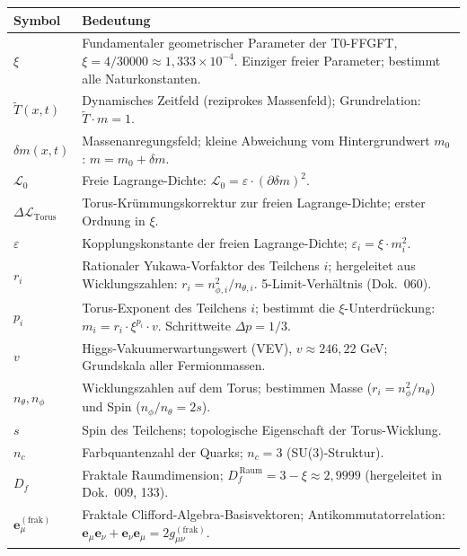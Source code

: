 \begin{longtable}{lp{9.5cm}}
\toprule
\textbf{Symbol} & \textbf{Bedeutung} \\
\midrule
\endhead
$\xi$ & Fundamentaler geometrischer Parameter der T0-FFGFT,
        $\xi = 4/30000 \approx 1{,}333 \times 10^{-4}$.
        Einziger freier Parameter; bestimmt alle Naturkonstanten. \\[4pt]
$\tilde{T}(x,t)$ & Dynamisches Zeitfeld (reziprokes Massenfeld);
        Grundrelation: $\tilde{T} \cdot m = 1$. \\[4pt]
$\delta m(x,t)$ & Massenanregungsfeld; kleine Abweichung vom
        Hintergrundwert $m_0$: $m = m_0 + \delta m$. \\[4pt]
$\mathcal{L}_0$ & Freie Lagrange-Dichte:
        $\mathcal{L}_0 = \varepsilon \cdot (\partial\delta m)^2$. \\[4pt]
$\Delta\mathcal{L}_{\mathrm{Torus}}$ & Torus-Krümmungskorrektur
        zur freien Lagrange-Dichte; erster Ordnung in $\xi$. \\[4pt]
$\varepsilon$ & Kopplungskonstante der freien Lagrange-Dichte;
        $\varepsilon_i = \xi \cdot m_i^2$. \\[4pt]
$r_i$ & Rationaler Yukawa-Vorfaktor des Teilchens $i$;
        hergeleitet aus Wicklungszahlen: $r_i = n_{\phi,i}^2/n_{\theta,i}$.
        5-Limit-Verhältnis (Dok.~060). \\[4pt]
$p_i$ & Torus-Exponent des Teilchens $i$; bestimmt die
        $\xi$-Unterdrückung: $m_i = r_i \cdot \xi^{p_i} \cdot v$.
        Schrittweite $\Delta p = 1/3$. \\[4pt]
$v$ & Higgs-Vakuumerwartungswert (VEV), $v \approx 246{,}22$ GeV;
        Grundskala aller Fermionmassen. \\[4pt]
$n_\theta, n_\phi$ & Wicklungszahlen auf dem Torus;
        bestimmen Masse ($r_i = n_\phi^2/n_\theta$) und
        Spin ($n_\phi/n_\theta = 2s$). \\[4pt]
$s$ & Spin des Teilchens; topologische Eigenschaft der
        Torus-Wicklung. \\[4pt]
$n_c$ & Farbquantenzahl der Quarks; $n_c = 3$ (SU(3)-Struktur). \\[4pt]
$D_f$ & Fraktale Raumdimension;
        $D_f^{\,\text{Raum}} = 3 - \xi \approx 2{,}9999$
        (hergeleitet in Dok.~009, 133). \\[4pt]
$\mathbf{e}_\mu^{(\mathrm{frak})}$ & Fraktale Clifford-Algebra-Basisvektoren;
        Antikommutatorrelation:
        $\mathbf{e}_\mu\mathbf{e}_\nu + \mathbf{e}_\nu\mathbf{e}_\mu
        = 2g_{\mu\nu}^{(\mathrm{frak})}$. \\[4pt]

\end{longtable}
